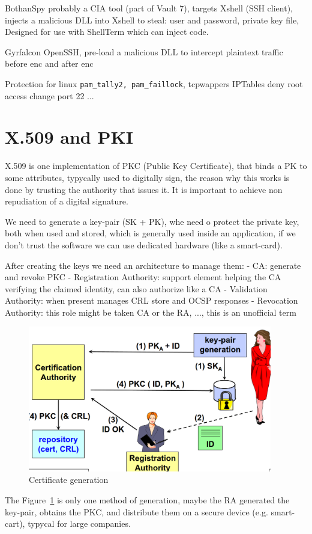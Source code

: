 \documentclass[12pt]{article}
\begin{document}
BothanSpy
probably a CIA tool (part of Vault 7), targets Xshell (SSH client), injects a malicious DLL into Xshell to steal: user and password, private key file,
Designed for use with ShellTerm which can inject code.

Gyrfalcon
OpenSSH, pre-load a malicious DLL to intercept plaintext traffic before enc and after enc


Protection for linux
\verb|pam_tally2, pam_faillock|,
tcpwappers
IPTables
deny root access
change port 22
...


\section{X.509 and PKI}
X.509 is one implementation of PKC (Public Key Certificate), that binds a PK to some attributes, typycally used to digitally sign, the reason why this works is done by trusting the authority that issues it. It is important to achieve non repudiation of a digital signature.

We need to generate a key-pair (SK + PK), whe need o protect the private key, both when used and stored, which is generally used inside an application, if we don't trust the software we can use dedicated hardware (like a smart-card).

After creating the keys we need an architecture to manage them:
- CA: generate and revoke PKC
- Registration Authority: support element helping the CA verifying the claimed identity, can also authorize like a CA
- Validation Authority: when present manages CRL store and OCSP responses
- Revocation Authority: this role might be taken CA or the RA, ..., this is an unofficial term
\begin{figure}
  \begin{center}
    \includegraphics[width=0.95\textwidth]{./img/certificate-generation.png}
  \end{center}
  \caption{Certificate generation}\label{fig:certificate-generation}
\end{figure}
The Figure~\ref{fig:certificate-generation} is only one method of generation, maybe the RA generated the key-pair, obtains the PKC, and distribute them on a secure device (e.g. smart-cart), typycal for large companies.
\end{document}
